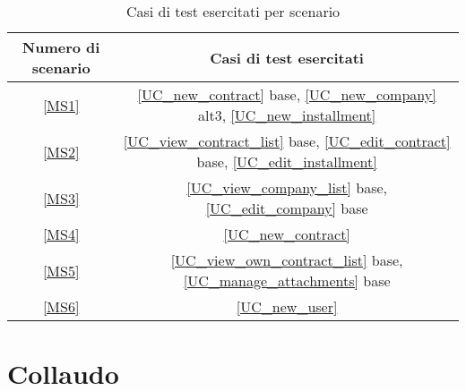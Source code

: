 \begin{table}[h]
\label{macro_scenari}
\caption{Casi di test esercitati per scenario}
\centering
  \begin{tabular}{| c | c |} 
    \hline
    Numero di scenario & Casi di test esercitati \\
    \hline
    \ref{MS1} & \ref{UC_new_contract} base, \ref{UC_new_company} alt3, \ref{UC_new_installment}\\
    \hline
    \ref{MS2} & \ref{UC_view_contract_list} base, \ref{UC_edit_contract} base, \ref{UC_edit_installment} \\
    \hline
    \ref{MS3} & \ref{UC_view_company_list} base, \ref{UC_edit_company} base \\
    \hline
    \ref{MS4} & \ref{UC_new_contract}\\
    \hline
    \ref{MS5} & \ref{UC_view_own_contract_list} base, \ref{UC_manage_attachments} base\\
    \hline
    \ref{MS6} & \ref{UC_new_user}\\
    \hline
  \end{tabular} 

\end{table} 

\section{Collaudo}


